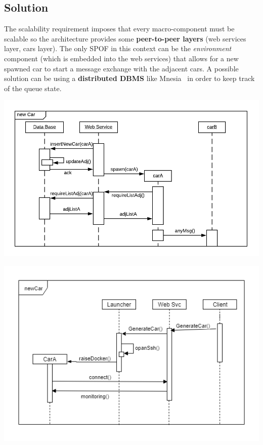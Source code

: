 \subsection{Solution}

The scalability requirement imposes that every macro-component must be scalable 
so the architecture provides some \textbf{peer-to-peer layers} 
(web services layer, cars layer).
The only SPOF in this context can be the \textit{environment} component 
(which is embedded into the web services) that allows for a new spawned car to 
start a message exchange with the adjacent cars. 
A possible solution can be using a \textbf{distributed DBMS} like Mnesia~\cite{1} in order to keep 
track of the queue state.

\begin{center}
    \includegraphics[scale=0.8]{assets/ds2019_1.png}
\end{center}

\begin{center}
    \includegraphics[scale=0.6]{assets/newCarclient.png}
\end{center}

